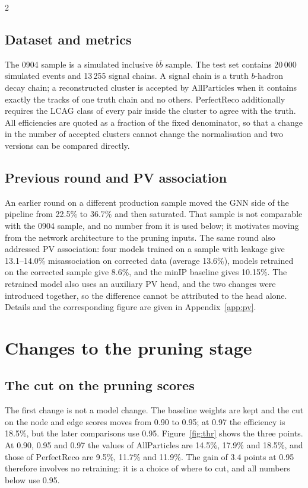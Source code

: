 \documentclass[10pt]{article}
\newcommand{\All}{\ensuremath{\mathrm{AllParticles}}}
\newcommand{\Perf}{\ensuremath{\mathrm{PerfectReco}}}
\begin{document}
\begin{multicols}{2}
\subsection{Dataset and metrics}

The 0904 sample is a simulated inclusive $b\bar b$ sample. The test set contains 20\,000 simulated events and 13\,255 signal chains. A signal chain is a truth $b$-hadron decay chain; a reconstructed cluster is accepted by \All{} when it contains exactly the tracks of one truth chain and no others. \Perf{} additionally requires the LCAG class of every pair inside the cluster to agree with the truth. All efficiencies are quoted as a fraction of the fixed denominator, so that a change in the number of accepted clusters cannot change the normalisation and two versions can be compared directly.

\subsection{Previous round and PV association}

An earlier round on a different production sample moved the GNN side of the pipeline from 22.5\% to 36.7\% and then saturated. That sample is not comparable with the 0904 sample, and no number from it is used below; it motivates moving from the network architecture to the pruning inputs. The same round also addressed PV association: four models trained on a sample with leakage give 13.1--14.0\% misassociation on corrected data (average 13.6\%), models retrained on the corrected sample give 8.6\%, and the minIP baseline gives 10.15\%. The retrained model also uses an auxiliary PV head, and the two changes were introduced together, so the difference cannot be attributed to the head alone. Details and the corresponding figure are given in Appendix~\ref{app:pv}.

\section{Changes to the pruning stage}
\label{sec:changes}

\subsection{The cut on the pruning scores}

The first change is not a model change. The baseline weights are kept and the cut on the node and edge scores moves from 0.90 to 0.95; at 0.97 the efficiency is 18.5\%, but the later comparisons use 0.95. Figure~\ref{fig:thr} shows the three points. At 0.90, 0.95 and 0.97 the values of \All{} are 14.5\%, 17.9\% and 18.5\%, and those of \Perf{} are 9.5\%, 11.7\% and 11.9\%. The gain of 3.4 points at 0.95 therefore involves no retraining: it is a choice of where to cut, and all numbers below use 0.95.


\end{multicols}
\end{document}
